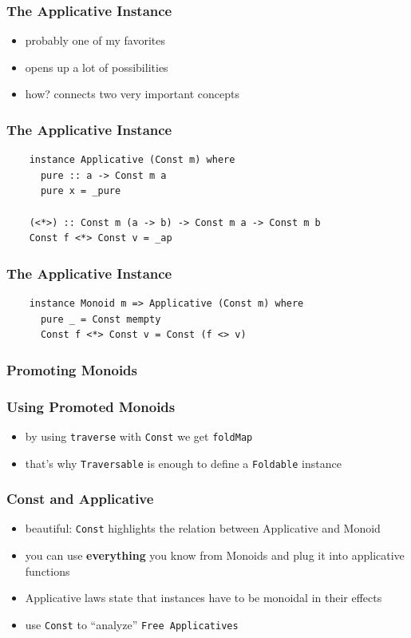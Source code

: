 \documentclass[aspectratio=169]{beamer}
\begin{document}
\begin{frame}
  \frametitle{The Applicative Instance}
  \begin{itemize}
  \item probably one of my favorites
  \item opens up a lot of possibilities
  \item how? connects two very important concepts
  \end{itemize}
\end{frame}

\begin{frame}[fragile]
  \frametitle{The Applicative Instance}
  \begin{verbatim}
    instance Applicative (Const m) where
      pure :: a -> Const m a
      pure x = _pure

    (<*>) :: Const m (a -> b) -> Const m a -> Const m b
    Const f <*> Const v = _ap
  \end{verbatim}
\end{frame}

\begin{frame}[fragile]
  \frametitle{The Applicative Instance}
  \begin{verbatim}
    instance Monoid m => Applicative (Const m) where
      pure _ = Const mempty
      Const f <*> Const v = Const (f <> v)
  \end{verbatim}
\end{frame}

\begin{frame}
  \frametitle{Promoting Monoids}
\end{frame}

\begin{frame}
  \frametitle{Using Promoted Monoids}
  \begin{itemize}
  \item by using \texttt{traverse} with \texttt{Const} we get \texttt{foldMap}
  \item that's why \texttt{Traversable} is enough to define a \texttt{Foldable} instance
  \end{itemize}
\end{frame}

\begin{frame}
  \frametitle{Const and Applicative}
  \begin{itemize}
  \item beautiful: \texttt{Const} highlights the relation between
    Applicative and Monoid
  \item you can use \textbf{everything} you know from Monoids and plug it into applicative functions
  \item Applicative laws state that instances have to be monoidal in
    their effects
  \item use \texttt{Const} to ``analyze'' \texttt{Free Applicatives}
  \end{itemize}
\end{frame}
\end{document}
